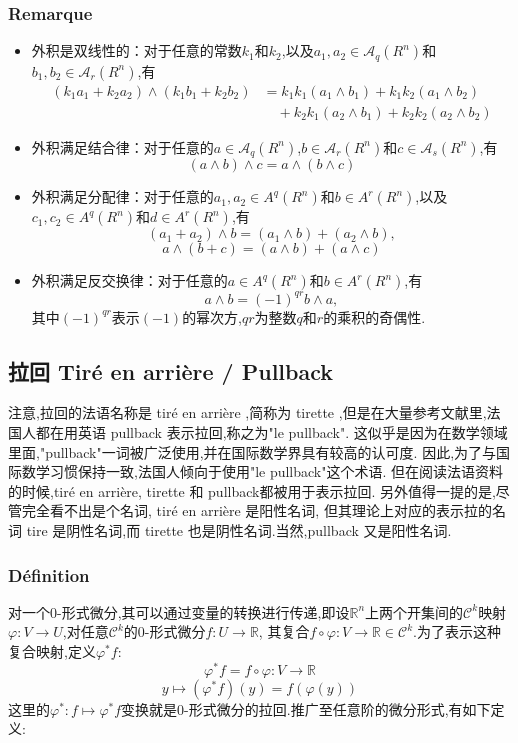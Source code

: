 \documentclass[12pt, a4paper, oneside]{ctexbook}
\newcommand{\R }{\mathbb{R}}%
\newcommand{\fai }{\varphi}%
\newcommand{\C }{\mathcal{C}}%
\begin{document}
  \subsubsection{Remarque}
  \begin{itemize}
    \item 外积是双线性的：对于任意的常数$k_1$和$k_2$,以及$a_1, a_2 \in \mathcal{A}_q(R^n)$和$b_1, b_2 \in \mathcal{A}_r(R^n)$,有
  \begin{align*}
  (k_1a_1 + k_2a_2) \wedge (k_1b_1 + k_2b_2) &= k_1k_1(a_1 \wedge b_1) + k_1k_2(a_1 \wedge b_2) \\
  &\quad+ k_2k_1(a_2 \wedge b_1) + k_2k_2(a_2 \wedge b_2)
  \end{align*}

  \item 外积满足结合律：对于任意的$a \in \mathcal{A}_q(R^n)$,$b \in \mathcal{A}_r(R^n)$和$c \in \mathcal{A}_s(R^n)$,有
  \[(a \wedge b) \wedge c = a \wedge (b \wedge c)\]

  \item 外积满足分配律：对于任意的$a_1, a_2 \in A^q(R^n)$和$b \in A^r(R^n)$,以及$c_1, c_2 \in A^q(R^n)$和$d \in A^r(R^n)$,有
  \[(a_1 + a_2) \wedge b = (a_1 \wedge b) + (a_2 \wedge b),\]
  \[a \wedge (b + c) = (a \wedge b) + (a \wedge c)\]

  \item 外积满足反交换律：对于任意的$a \in A^q(R^n)$和$b \in A^r(R^n)$,有
  \[a \wedge b = (-1)^{qr} b \wedge a,\]
  其中$(-1)^{qr}$表示$(-1)$的幂次方,$qr$为整数$q$和$r$的乘积的奇偶性.
  \end{itemize}
  \subsection{拉回 Tiré en arrière / Pullback}
  注意,拉回的法语名称是 tiré en arrière ,简称为 tirette ,但是在大量参考文献里,法国人都在用英语 pullback 表示拉回,称之为"le pullback".
  这似乎是因为在数学领域里面,"pullback"一词被广泛使用,并在国际数学界具有较高的认可度.
  因此,为了与国际数学习惯保持一致,法国人倾向于使用"le pullback"这个术语.
  但在阅读法语资料的时候,tiré en arrière, tirette 和 pullback都被用于表示拉回.
  另外值得一提的是,尽管完全看不出是个名词, tiré en arrière 是阳性名词,
  但其理论上对应的表示拉的名词 tire 是阴性名词,而 tirette 也是阴性名词.当然,pullback 又是阳性名词.
  \subsubsection{Définition}
  对一个0-形式微分,其可以通过变量的转换进行传递,即设$\R^n$上两个开集间的$\C^k$映射$\fai:V\to U$,对任意$\C^k$的0-形式微分$f:U\to\R$,
  其复合$f\circ \fai:V\to\R \in\C^k$.为了表示这种复合映射,定义$\fai^*f$:
  $$
  \fai^*f=f\circ\fai:V\to\R
  $$
  $$
  y\mapsto (\fai^*f)(y)=f(\fai(y))
  $$
  这里的$\fai^*:f\mapsto \fai^*f$变换就是0-形式微分的拉回.推广至任意阶的微分形式,有如下定义:
\end{document}
